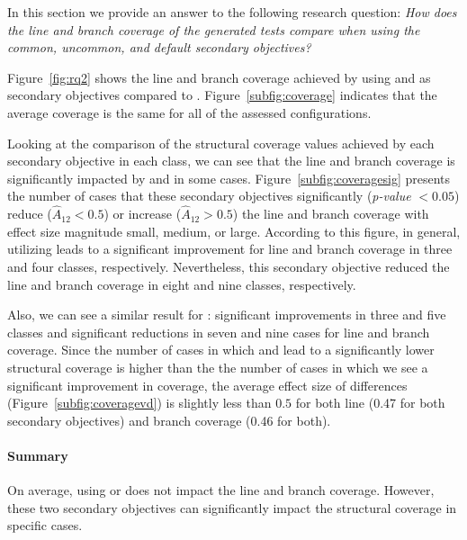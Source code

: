 In this section we provide an answer to the following research question: \emph{How does the \emph{line} and \emph{branch coverage} of the generated tests  compare when using the \textit{common}, \textit{uncommon}, and \textit{default} secondary objectives?}

Figure~\ref{fig:rq2} shows the line and branch coverage achieved by using \com and \ucom as secondary objectives compared to \df. Figure~\ref{subfig:coverage} indicates that the average coverage is the same for all of the assessed configurations.

Looking at the comparison of the structural coverage values achieved by each secondary objective in each class, we can see that the line and branch coverage is significantly impacted by \com and \ucom in some cases. Figure~\ref{subfig:coveragesig} presents the number of cases that these secondary objectives significantly (\textit{p-value} $<0.05$) reduce ($\widehat{A}_{12} < 0.5$) or increase ($\widehat{A}_{12} > 0.5$) the line and branch coverage with effect size magnitude small, medium, or large. According to this figure, in general, utilizing \com leads to a significant improvement for line and branch coverage in three and four classes, respectively. Nevertheless, this secondary objective reduced the line and branch coverage in eight and nine classes, respectively. 

Also, we can see a similar result for \ucom:
significant improvements in three and five classes and significant reductions in seven and nine cases for line and branch coverage. Since the number of cases in which \com and \ucom lead to a significantly lower structural coverage is higher than the the number of cases in which we see a significant improvement in coverage, the average effect size of differences (Figure~\ref{subfig:coveragevd}) is slightly less than  $0.5$ for both line (0.47 for both secondary objectives) and branch coverage (0.46 for both).

\paragraph{Summary} On average, using \com or \ucom does not impact the line and branch coverage. However, these two secondary objectives can significantly impact the structural coverage in specific cases.

